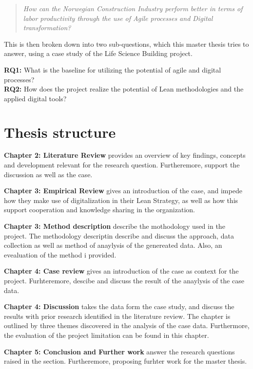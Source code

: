 \begin{quote}
    \textit{How can the Norwegian Construction Industry perform better in terms of labor productivity through the use of Agile processes and Digital transformation?} 
\end{quote}

This is then broken down into two sub-questions, which this master thesis tries to answer, using a case study of the Life Science Building project.

{\noindent \bf RQ1:} What is the baseline for utilizing the potential of agile and digital processes? \\
{\noindent \bf RQ2:} How does the project realize the potential of Lean methodologies and the applied digital tools?

\section{Thesis structure} \label{sec:thesis}

{\noindent \bf Chapter 2: Literature Review} provides an overview of key findings, concepts and development relevant for the research question. Furtheremore, support the discussion as well as the case. 

{\noindent \bf Chapter 3: Empirical Review} gives an introduction of the case, and impede how they make use of digitalization in their Lean Strategy, as well as how this support cooperation and knowledge sharing in the organization.

{\noindent \bf Chapter 3: Method description} describe the mothodology used in the project. The methodology descriptin describe and discuss the approach, data collection as well as method of anaylysis of the genereated data. Also, an evealuation of the method i provided.

{\noindent \bf Chapter 4: Case review} gives an introduction of the case as context for the project. Furhteremore, descibe and discuss the result of the anaylysis of the case data. 

{\noindent \bf Chapter 4: Discussion} takes the data form the case study, and discuss the results with prior research identified in the literature review. The chapter is outlined by three themes discovered in the analysis of the case data. Furthermore, the evaluation of the project limitation can be found in this chapter.

{\noindent \bf Chapter 5: Conclusion and Further work} answer the research questions raised in the  section. Furtheremore, proposing furhter work for the master thesis.


\cleardoublepage